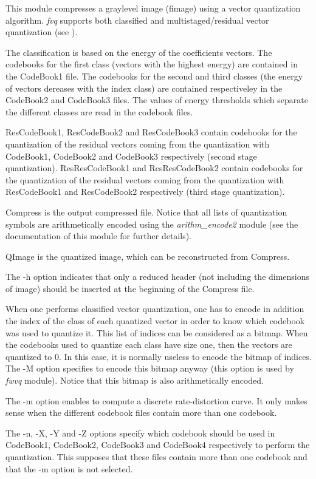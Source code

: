 This module compresses a graylevel image (fimage) using a vector quantization 
algorithm. {\em fvq} supports both classified and multistaged/residual 
vector quantization (see \cite{kn:gg}). 

The classification is based on the energy of the coefficients vectors. 
The codebooks for the first class (vectors with the highest energy) 
are contained in the CodeBook1 file.  The codebooks for the second and third 
classes (the energy of vectors dereases with the index class) 
are contained respectiveley in the CodeBook2 and CodeBook3 files. 
The values of energy thresholds which separate the different classes 
are read in the codebook files. 

ResCodeBook1, ResCodeBook2 and ResCodeBook3 contain codebooks 
for the quantization of the residual vectors coming from the 
quantization with CodeBook1, CodeBook2 and CodeBook3 respectively 
(second stage quantization). 
ResResCodeBook1 and ResResCodeBook2 contain codebooks 
for the quantization of the residual vectors coming from the 
quantization with ResCodeBook1 and ResCodeBook2 respectively 
(third stage quantization). 

Compress is the output compressed file. Notice that all lists 
of quantization symbols are arithmetically encoded using the 
{\em arithm\_encode2} module (see the documentation of this module 
for further details). 

QImage is the quantized image, which can be reconstructed 
from Compress. 

The -h option indicates that only a reduced header (not including 
the dimensions of image) should be inserted at the beginning 
of the Compress file. 

When one performs classified vector quantization, one has to encode 
in addition the index of the class of each quantized vector in order 
to know which codebook was used to quantize it. This list of indices 
can be considered as a bitmap. When the codebooks used to quantize each class 
have size one, then the vectors are quantized to 0. In this case, it is 
normally useless to encode the bitmap of indices. The -M option 
specifies to encode this bitmap anyway (this option is used by {\em fwvq} 
module). Notice that this bitmap is also arithmetically encoded. 

The -m option enables to compute a discrete rate-distortion curve. 
It only makes sense when the different codebook files contain more 
than one codebook.

The -n, -X, -Y and -Z options specify which codebook should be used 
in CodeBook1, CodeBook2, CodeBook3 and CodeBook4 respectively 
to perform the quantization. This supposes that these files contain 
more than one codebook and that the -m option is not selected.   

